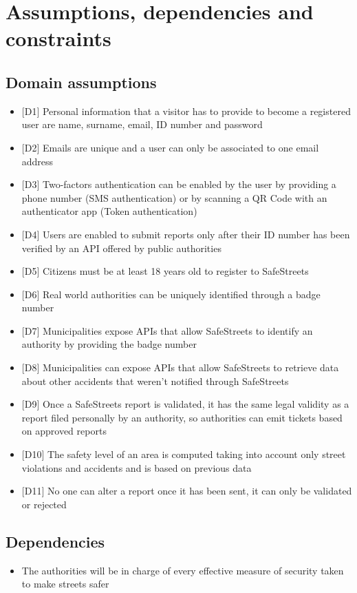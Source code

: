 \section{Assumptions, dependencies and constraints}

\subsection{Domain assumptions}
  \begin{itemize}
    \item $[$D1$]$ Personal information that a visitor has to provide to become a registered user are name, surname, email, ID number and password
    \item $[$D2$]$ Emails are unique and a user can only be associated to one email address
    \item $[$D3$]$ Two-factors authentication can be enabled by the user by providing a phone number (SMS authentication) or by scanning a QR Code with an authenticator app (Token authentication)
    \item $[$D4$]$ Users are enabled to submit reports only after their ID number has been verified by an API offered by public authorities
    \item $[$D5$]$ Citizens must be at least 18 years old to register to SafeStreets
    \item $[$D6$]$ Real world authorities can be uniquely identified through a badge number
    \item $[$D7$]$ Municipalities expose APIs that allow SafeStreets to identify an authority by providing the badge number
    \item $[$D8$]$ Municipalities can expose APIs that allow SafeStreets to retrieve data about other accidents that weren't notified through SafeStreets
    \item $[$D9$]$ Once a SafeStreets report is validated, it has the same legal validity as a report filed personally by an authority, so authorities can emit tickets based on approved reports
    \item $[$D10$]$ The safety level of an area is computed taking into account only street violations and accidents and is based on previous data
    \item $[$D11$]$ No one can alter a report once it has been sent, it can only be validated or rejected
  \end{itemize}

\subsection{Dependencies}
  \begin{itemize}
    \item The authorities will be in charge of every effective measure of security taken to make streets safer
  \end{itemize}
